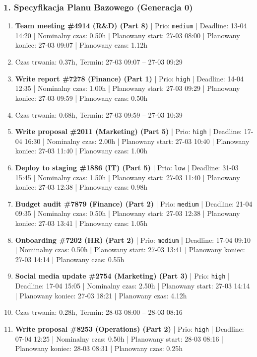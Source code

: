 \subsubsection*{1. Specyfikacja Planu Bazowego (Generacja 0)}
{\small
\begin{enumerate}
  \item [\textbf{14638}] \textbf{Team meeting \#4914 (R\&D) (Part 8)} | Prio: \texttt{medium} | Deadline: 13-04 14:20 | Nominalny czas: 0.50h | Planowany start: 27-03 08:00 | Planowany koniec: 27-03 09:07 | Planowany czas: 1.12h
  \item [\textbf{PRZERWA}] Czas trwania: 0.37h, Termin: 27-03 09:07 -- 27-03 09:29
  \item [\textbf{14609}] \textbf{Write report \#7278 (Finance) (Part 1)} | Prio: \texttt{high} | Deadline: 14-04 12:35 | Nominalny czas: 1.00h | Planowany start: 27-03 09:29 | Planowany koniec: 27-03 09:59 | Planowany czas: 0.50h
  \item [\textbf{PRZERWA}] Czas trwania: 0.68h, Termin: 27-03 09:59 -- 27-03 10:39
  \item [\textbf{14628}] \textbf{Write proposal \#2011 (Marketing) (Part 5)} | Prio: \texttt{high} | Deadline: 17-04 16:30 | Nominalny czas: 2.00h | Planowany start: 27-03 10:40 | Planowany koniec: 27-03 11:40 | Planowany czas: 1.00h
  \item [\textbf{14697}] \textbf{Deploy to staging \#1886 (IT) (Part 5)} | Prio: \texttt{low} | Deadline: 31-03 15:45 | Nominalny czas: 1.50h | Planowany start: 27-03 11:40 | Planowany koniec: 27-03 12:38 | Planowany czas: 0.98h
  \item [\textbf{14644}] \textbf{Budget audit \#7879 (Finance) (Part 2)} | Prio: \texttt{medium} | Deadline: 21-04 09:35 | Nominalny czas: 0.50h | Planowany start: 27-03 12:38 | Planowany koniec: 27-03 13:41 | Planowany czas: 1.05h
  \item [\textbf{14648}] \textbf{Onboarding \#7202 (HR) (Part 2)} | Prio: \texttt{medium} | Deadline: 17-04 09:10 | Nominalny czas: 0.50h | Planowany start: 27-03 13:41 | Planowany koniec: 27-03 14:14 | Planowany czas: 0.55h
  \item [\textbf{14611}] \textbf{Social media update \#2754 (Marketing) (Part 3)} | Prio: \texttt{high} | Deadline: 17-04 15:05 | Nominalny czas: 2.50h | Planowany start: 27-03 14:14 | Planowany koniec: 27-03 18:21 | Planowany czas: 4.12h
  \item [\textbf{PRZERWA}] Czas trwania: 0.28h, Termin: 28-03 08:00 -- 28-03 08:16
  \item [\textbf{14614}] \textbf{Write proposal \#8253 (Operations) (Part 2)} | Prio: \texttt{high} | Deadline: 07-04 12:25 | Nominalny czas: 0.50h | Planowany start: 28-03 08:16 | Planowany koniec: 28-03 08:31 | Planowany czas: 0.25h

\end{enumerate}}
